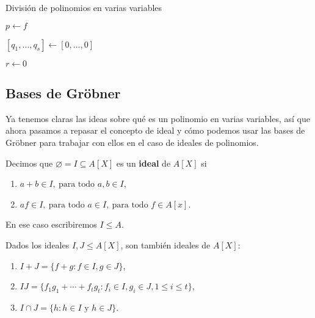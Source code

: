 \begin{algorithm}[hbt!]
    \caption{División de polinomios en varias variables}\label{a:division}
    $p\gets f$
    
    $\left[q_1,\dots, q_s\right] \gets \left[0,\dots, 0\right]$
    
    $r\gets 0$

\end{algorithm}

\subsection{Bases de Gröbner}
Ya tenemos claras las ideas sobre qué es un polinomio en varias variables, así que ahora pasamos a repasar el concepto de ideal y cómo podemos usar las bases de Gröbner para trabajar con ellos en el caso de ideales de polinomios.
\begin{definicion}
    Decimos que $\varnothing = I \subseteq A[X]$ es un \textbf{ideal} de $A[X]$ si
    \begin{enumerate}
        \item $a+b\in I,\ \text{para todo } a,b\in I$,
        \item $af\in I,\ \text{para todo } a\in I,\ \text{para todo } f\in A[x]$.
    \end{enumerate}
    En ese caso escribiremos $I\le A$.
\end{definicion}

\begin{proposicion}
    Dados los ideales $I,J\le A[X]$, son también ideales de $A[X]$:
    \begin{enumerate}
        \item $I+J = \{f+g : f\in I, g\in J\}$,
        \item $IJ = \{f_1g_1 + \cdots + f_tg_t : f_i\in I, g_i\in J, 1\le i \le t\}$,
        \item $I\cap J = \{h: h\in I \text{ y } h\in J\}$.
    \end{enumerate}
\end{proposicion}

